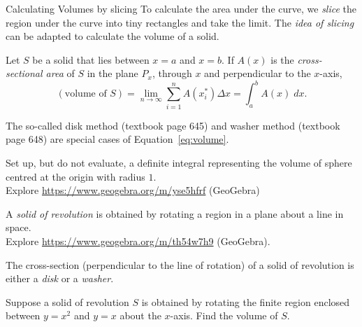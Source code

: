\documentclass[../main.tex]{subfiles}
\begin{document}
\begin{lesson}{Calculating Volumes by slicing}
  To calculate the area under the curve, we \emph{slice} the region under the curve into tiny rectangles and take the limit. The \emph{idea of slicing} can be adapted to calculate the volume of a solid.

  \begin{mdframed}[style=withref]
    Let \(S\) be a solid that lies between \(x=a\) and \(x=b\). If \(A(x)\) is the \emph{cross-sectional area} of \(S\) in the plane \(P_{x}\), through \(x\) and perpendicular to the \(x\)-axis, 
    \begin{equation} \label{eq:volume}
      (\text{volume of } S) = \lim_{n \to \infty} \sum_{i=1}^{n} A(x_{i}^{*}) \Delta x = \int_{a}^{b} A(x) \;dx.
    \end{equation}

    The so-called disk method (textbook page 645) and washer method (textbook page 648) are special cases of Equation~\eqref{eq:volume}.
  \end{mdframed}
  \vspace{2in}

  \begin{example}
    Set up, but do not evaluate, a definite integral representing the volume of sphere centred at the origin with radius \(1\). \\
    {\footnotesize Explore \url{https://www.geogebra.org/m/yse5hfrf} (GeoGebra)}
  \end{example}
  \clearpage


  A \emph{solid of revolution} is obtained by rotating a region in a plane about a line in space. \\
  {\footnotesize Explore \url{https://www.geogebra.org/m/th54w7h9} (GeoGebra).}


  The cross-section (perpendicular to the line of rotation) of a solid of revolution is either a \emph{disk} or a \emph{washer}.
  \vspace{2in}


  \begin{example}
    Suppose a solid of revolution \(S\) is obtained by rotating the finite region enclosed between \(y = x^{2}\) and \(y = x\) about the \(x\)-axis. Find the volume of \(S\).



\end{example}
\end{lesson}
\end{document}
